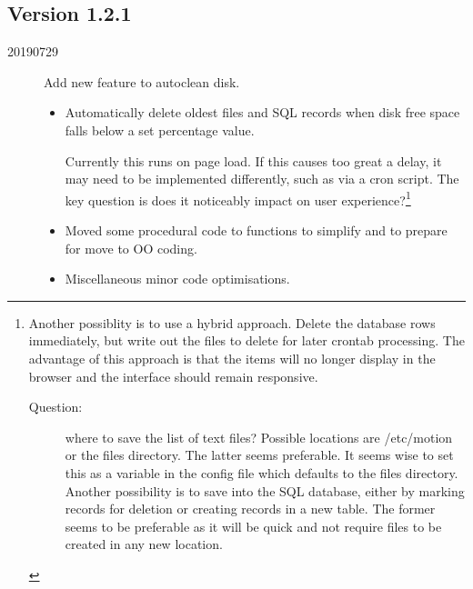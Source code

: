 \documentclass[12pt]{scrartcl} %
\begin{document}
	\subsection{Version 1.2.1}
            \begin{description}
            		\item [20190729] Add new feature to autoclean disk.
			\begin{itemize}
                		\item Automatically delete oldest files and SQL records when disk free space falls below a set percentage value.
                		
                		Currently this runs on page load. If this causes too great a delay, it may need to be implemented differently, such as via a cron script. The key question is does it noticeably impact on user experience?\footnote
	{Another possiblity is to use a hybrid approach. Delete the database rows immediately, but write out the files to delete for later crontab processing. The advantage of this approach is that the items will no longer display in the browser and the interface should remain responsive.
			\begin{description}
				\item [Question:] where to save the list of text files? Possible locations are /etc/motion or the files directory. The latter seems preferable. It seems wise to set this as a variable in the config file which defaults to the files directory. Another possibility is to save into the SQL database, either by marking records for deletion or creating records in a new table. The former seems to be preferable as it will be quick and not require files to be created in any new location.
            \end{description}
	}
            
               		 \item Moved some procedural code to functions to simplify and to prepare for move to OO coding.
               		 
               		 \item Miscellaneous minor code optimisations.
               		 
                   \end{itemize}
            \end{description}
            
\end{document}
